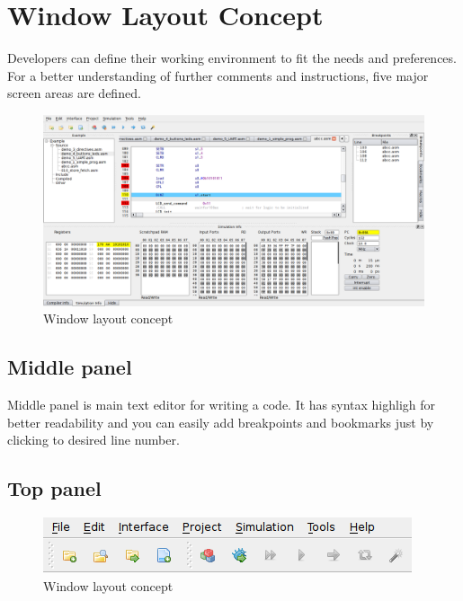 \section{Window Layout Concept}
    Developers can define their working environment to fit the needs and preferences. For a better understanding of further comments and instructions, five major screen areas are defined. %


   \begin{figure}[h]
        \centering
        \includegraphics[width=\textwidth]{img/Main_window.png}
        \caption{Window layout concept}
    \end{figure}

\subsection{Middle panel}
    Middle panel is main text editor for writing a code. It has syntax highligh for better readability and you can easily add breakpoints and bookmarks just by clicking to desired line number.

\subsection{Top panel}


   \begin{figure}[h!]
        \centering
        \includegraphics[width=\textwidth]{img/top_panel.png}
        \caption{Window layout concept}
    \end{figure}
    
